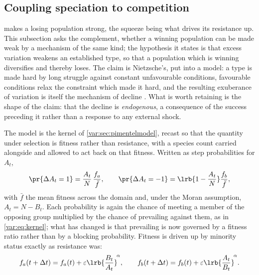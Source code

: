 
\subsection{Coupling speciation to competition}
\label{var:sec:pimentelplus}

 makes a losing population strong, the squeeze being
what drives its resistance up. This subsection asks the complement, whether a
winning population can be made weak by a mechanism of the same kind; the
hypothesis it states is that excess variation weakens an established type, so
that a population which is winning diversifies and thereby loses. The claim
is Nietzsche's, put into a model: a type is made hard by long struggle
against constant unfavourable conditions, favourable conditions relax the
constraint which made it hard, and the resulting exuberance of variation
is itself the mechanism of decline \cite{nietzsche2013beyond}. What is worth retaining is the shape of the claim: that the decline is
\emph{endogenous}, a consequence of the success preceding it rather than a
response to any external shock.

The model is the kernel of \cref{var:sec:pimentelmodel}, recast so that the
quantity under selection is fitness rather than resistance, with a species
count carried alongside and allowed to act back on that fitness. Written as
step probabilities for $A_t$,
\begin{equation}
\pr{\Delta A_t=1}=\frac{A_t}{N}\,\frac{f_a}{\bar f},
\qquad
\pr{\Delta A_t=-1}=\lrb{1-\frac{A_t}{N}}\frac{f_b}{\bar f},
\label{var:eq:fitkernel}
\end{equation}
with $\bar f$ the mean fitness across the domain and, under the Moran
assumption, $A_t=N-B_t$. Each probability is again the chance of meeting a
member of the opposing group multiplied by the chance of prevailing against
them, as in \cref{var:eq:kernel}; what has changed is that prevailing is now
governed by a fitness ratio rather than by a blocking probability. Fitness is
driven up by minority status exactly as resistance was:
\begin{equation}
f_a(t+\Delta t)=f_a(t)+\varepsilon\lrb{\frac{B_t}{A_t}}^{\!\alpha},
\qquad
f_b(t+\Delta t)=f_b(t)+\varepsilon\lrb{\frac{A_t}{B_t}}^{\!\alpha}.
\label{var:eq:fitupdate}
\end{equation}


